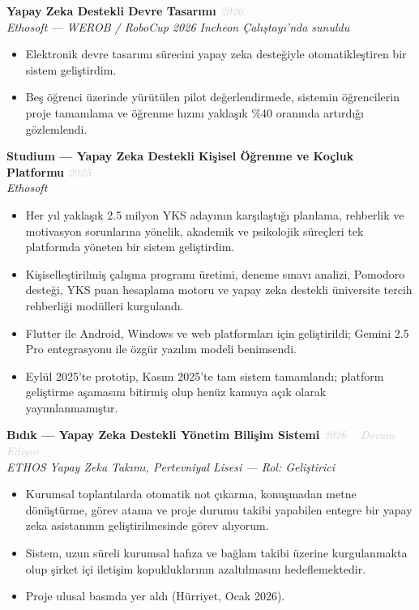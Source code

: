 \documentclass[11pt,a4paper]{article}
\newcommand{\blueitem}[1]{\textcolor{subtitleblue}{\textbf{#1}}}
\newcommand{\daterange}[1]{\hfill \textcolor{lightgray}{\textit{#1}}}
\begin{document}
\blueitem{Yapay Zeka Destekli Devre Tasarımı} \daterange{2026}\\
\textit{Ethosoft --- WEROB / RoboCup 2026 Incheon Çalıştayı'nda sunuldu}
\begin{itemize}
    \item Elektronik devre tasarımı sürecini yapay zeka desteğiyle otomatikleştiren bir sistem geliştirdim.
    \item Beş öğrenci üzerinde yürütülen pilot değerlendirmede, sistemin öğrencilerin proje tamamlama ve öğrenme hızını yaklaşık \%40 oranında artırdığı gözlemlendi.
\end{itemize}

\blueitem{Studium --- Yapay Zeka Destekli Kişisel Öğrenme ve Koçluk Platformu} \daterange{2025}\\
\textit{Ethosoft}
\begin{itemize}
    \item Her yıl yaklaşık 2.5 milyon YKS adayının karşılaştığı planlama, rehberlik ve motivasyon sorunlarına yönelik, akademik ve psikolojik süreçleri tek platformda yöneten bir sistem geliştirdim.
    \item Kişiselleştirilmiş çalışma programı üretimi, deneme sınavı analizi, Pomodoro desteği, YKS puan hesaplama motoru ve yapay zeka destekli üniversite tercih rehberliği modülleri kurgulandı.
    \item Flutter ile Android, Windows ve web platformları için geliştirildi; Gemini 2.5 Pro entegrasyonu ile özgür yazılım modeli benimsendi.
    \item Eylül 2025'te prototip, Kasım 2025'te tam sistem tamamlandı; platform geliştirme aşamasını bitirmiş olup henüz kamuya açık olarak yayımlanmamıştır.
\end{itemize}

\blueitem{Bıdık --- Yapay Zeka Destekli Yönetim Bilişim Sistemi} \daterange{2026 -- Devam Ediyor}\\
\textit{ETHOS Yapay Zeka Takımı, Pertevniyal Lisesi --- Rol: Geliştirici}
\begin{itemize}
    \item Kurumsal toplantılarda otomatik not çıkarma, konuşmadan metne dönüştürme, görev atama ve proje durumu takibi yapabilen entegre bir yapay zeka asistanının geliştirilmesinde görev alıyorum.
    \item Sistem, uzun süreli kurumsal hafıza ve bağlam takibi üzerine kurgulanmakta olup şirket içi iletişim kopukluklarının azaltılmasını hedeflemektedir.
    \item Proje ulusal basında yer aldı (Hürriyet, Ocak 2026).
\end{itemize}
\end{document}
